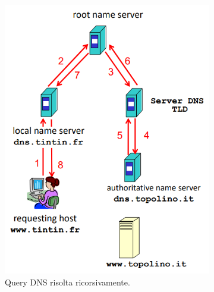 \documentclass[11pt, italian, openany]{book}
\begin{document}
\begin{sloppypar}
\begin{figure}[!h]
	\begin{subfigure}[t]{0.49 \linewidth} \centering
		\includegraphics[scale=0.35]{images/dns-query-ricorsiva.png}
		\caption{Query DNS risolta ricorsivamente.}
	\end{subfigure}
	\begin{subfigure}[t]{0.49 \linewidth} \centering

\end{subfigure}
\end{figure}
\end{sloppypar}
\end{document}
